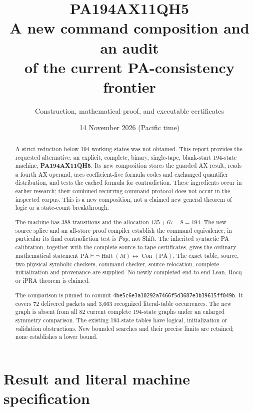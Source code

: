 \documentclass[11pt,letterpaper]{article}
\title{PA194AX11QH5\\[5pt]\Large A new command composition and an audit\\of the current PA-consistency frontier}
\author{Construction, mathematical proof, and executable certificates}
\date{14 November 2026 (Pacific time)}
\newcommand{\PA}{\mathrm{PA}}
\newcommand{\Con}{\operatorname{Con}}
\newcommand{\Halt}{\operatorname{Halt}}
\begin{document}
\maketitle
\begin{abstract}
A strict reduction below 194 working states was not obtained. This report
provides the requested alternative: an explicit, complete, binary,
single-tape, blank-start 194-state machine, \textbf{PA194AX11QH5}.
Its new composition stores the guarded AX result, reads a fourth AX operand,
uses coefficient-five formula codes and exchanged quantifier distribution,
and tests the cached formula for contradiction. These ingredients occur in
earlier research; their combined recurring command protocol does not occur
in the inspected corpus. This is a new composition, not a claimed new
general theorem of logic or a state-count breakthrough.

The machine has 388 transitions and the allocation $135+67-8=194$.
The new source splice and an all-store proof compiler establish the command
equivalence; in particular its final contradiction test is \emph{Pop}, not
Shift. The inherited syntactic PA calibration, together with the complete
source-to-tape certificates, gives the ordinary mathematical statement
\(\PA\vdash\neg\Halt(M)\leftrightarrow\Con(\PA)\).
The exact table, source, two physical symbolic checkers, command checker,
source relocation, complete initialization and provenance are supplied.
No newly completed end-to-end Lean, Rocq or iPRA theorem is claimed.

The comparison is pinned to commit
\texttt{4be5c6e3a10292a7466f5d3687e3b39615ff049b}. It covers 72 delivered
packets and 3,663 recognized literal-table occurrences. The new graph is
absent from all 82 current complete 194-state graphs under an enlarged
symmetry comparison. The existing 193-state tables have logical,
initialization or validation obstructions. New bounded searches and their
precise limits are retained; none establishes a lower bound.
\end{abstract}
\clearpage
\tableofcontents
\clearpage

\section{Result and literal machine specification}
\label{sec:result}
\end{document}

